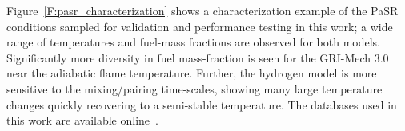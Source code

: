 \documentclass[preprint,review,11pt]{elsarticle}
\begin{document}
Figure~\ref{F:pasr_characterization} shows a characterization example of the PaSR conditions sampled for validation and performance testing in this work; a wide range of temperatures and fuel-mass fractions are observed for both models.
Significantly more diversity in fuel mass-fraction is seen for the GRI-Mech 3.0 near the adiabatic flame temperature.
Further, the hydrogen model is more sensitive to the mixing\slash pairing time-scales, showing many large temperature changes quickly recovering to a semi-stable temperature.
The databases used in this work are available online~\cite{Curtis2016:h2,Curtis2016:ch4}.


\clearpage



\end{document}
